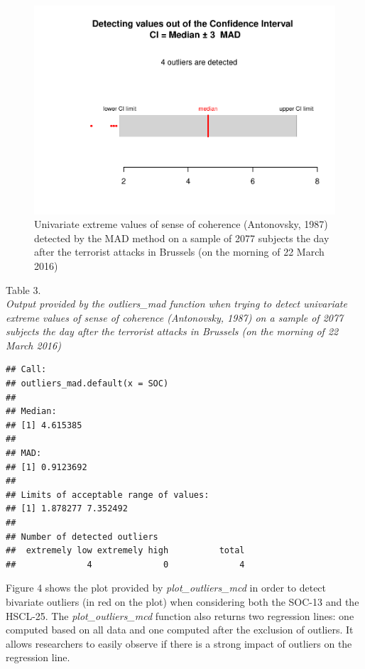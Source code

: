 \documentclass[man,floatsintext]{apa6}
\begin{document}
\begin{figure}
\centering
\includegraphics{Outliers_files/figure-latex/MADSOC-1.pdf}
\caption{\label{fig:MADSOC}Univariate extreme values of sense of coherence (Antonovsky, 1987) detected by the MAD method on a sample of 2077 subjects the day after the terrorist attacks in Brussels (on the morning of 22 March 2016)}
\end{figure}

Table 3.\\
\emph{Output provided by the outliers\_mad function when trying to detect univariate extreme values of sense of coherence (Antonovsky, 1987) on a sample of 2077 subjects the day after the terrorist attacks in Brussels (on the morning of 22 March 2016)}

\begin{verbatim}
## Call:
## outliers_mad.default(x = SOC)
## 
## Median:
## [1] 4.615385
## 
## MAD:
## [1] 0.9123692
## 
## Limits of acceptable range of values:
## [1] 1.878277 7.352492
## 
## Number of detected outliers
##  extremely low extremely high          total 
##              4              0              4
\end{verbatim}

Figure 4 shows the plot provided by \emph{plot\_outliers\_mcd} in order to detect bivariate outliers (in red on the plot) when considering both the SOC-13 and the HSCL-25. The \emph{plot\_outliers\_mcd} function also returns two regression lines: one computed based on all data and one computed after the exclusion of outliers. It allows researchers to easily observe if there is a strong impact of outliers on the regression line.
\end{document}
